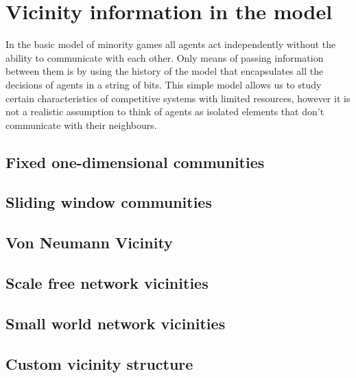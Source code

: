 \chapter{Vicinity information in the model}
\label{chapter:vicinity}

In the basic model of minority games all agents act independently without the ability to communicate with each other.
Only means of passing information between them is by using the history of the model that encapsulates all the decisions of agents in a string of bits.
This simple model allows us to study certain characteristics of competitive systems with limited resources, however it is not a realistic assumption to think of agents as isolated elements that don't communicate with their neighbours.

\section{Fixed one-dimensional communities}
\label{sec:fixed communities}

\section{Sliding window communities}
\label{sec:sliding communities}

\section{Von Neumann Vicinity}
\label{sec:von neumann}

\section{Scale free network vicinities}
\label{sec:scale free}

\section{Small world network vicinities}
\label{sec:small world}

\section{Custom vicinity structure}
\label{sec:custom vicinity}